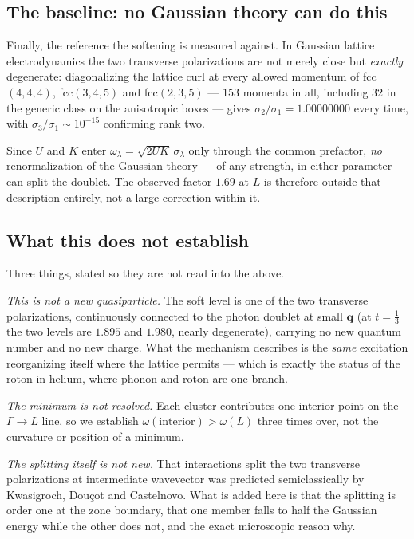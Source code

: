 \documentclass[11pt]{article}
\newcommand{\bq}{\bm q}
\begin{document}
\subsection{The baseline: no Gaussian theory can do this}

Finally, the reference the softening is measured against. In Gaussian
lattice electrodynamics the two transverse polarizations are not merely
close but \emph{exactly} degenerate: diagonalizing the lattice curl at
every allowed momentum of fcc$(4,4,4)$, fcc$(3,4,5)$ and fcc$(2,3,5)$
--- $153$ momenta in all, including $32$ in the generic class on the
anisotropic boxes --- gives $\sigma_2/\sigma_1=1.00000000$ every time,
with $\sigma_3/\sigma_1\sim10^{-15}$ confirming rank two.

Since $U$ and $K$ enter $\omega_\lambda=\sqrt{2UK}\,\sigma_\lambda$ only
through the common prefactor, \emph{no} renormalization of the Gaussian
theory --- of any strength, in either parameter --- can split the
doublet. The observed factor $1.69$ at $L$ is therefore outside that
description entirely, not a large correction within it.

\subsection{What this does not establish}
\label{sec:notclaimed}

Three things, stated so they are not read into the above.

\emph{This is not a new quasiparticle.} The soft level is one of the two
transverse polarizations, continuously connected to the photon doublet
at small $\bq$ (at $t=\tfrac13$ the two levels are $1.895$ and $1.980$,
nearly degenerate), carrying no new quantum number and no new
charge. What the mechanism describes is the \emph{same} excitation
reorganizing itself where the lattice permits --- which is exactly the
status of the roton in helium, where phonon and roton are one branch.

\emph{The minimum is not resolved.} Each cluster contributes one
interior point on the $\Gamma\to L$ line, so we establish
$\omega(\text{interior})>\omega(L)$ three times over, not the curvature
or position of a minimum.

\emph{The splitting itself is not new.} That interactions split the two
transverse polarizations at intermediate wavevector was predicted
semiclassically by Kwasigroch, Dou\c{c}ot and Castelnovo. What is added
here is that the splitting is order one at the zone boundary, that one
member falls to half the Gaussian energy while the other does not, and
the exact microscopic reason why.
\end{document}
